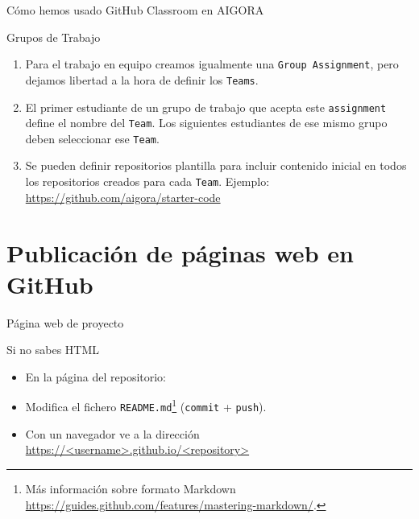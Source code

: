 \documentclass[xcolor={usenames,svgnames,dvipsnames}]{beamer}
\begin{document}
\begin{frame}[label={sec:orga7938a5},fragile]{Cómo hemos usado GitHub Classroom en AIGORA}
 \begin{block}{Grupos de Trabajo}
\begin{enumerate}
\item Para el trabajo en equipo creamos igualmente una \texttt{Group Assignment}, pero dejamos libertad a la hora de definir los \texttt{Teams}.
\item El primer estudiante de un grupo de trabajo que acepta este \texttt{assignment} define el nombre del \texttt{Team}. Los siguientes estudiantes de ese mismo grupo deben seleccionar ese \texttt{Team}.
\item Se pueden definir repositorios plantilla para incluir contenido inicial en todos los repositorios creados para cada \texttt{Team}. Ejemplo: \url{https://github.com/aigora/starter-code}
\end{enumerate}
\end{block}
\end{frame}

\section{Publicación de páginas web en GitHub}
\label{sec:orgcb46848}

\begin{frame}[label={sec:org16b4a2c},fragile]{Página web de \alert{proyecto}}
 \begin{block}{Si no sabes HTML}
\begin{itemize}
\item En la página del repositorio:
\end{itemize}

\begin{center}

\end{center}

\begin{itemize}
\item Modifica el fichero \texttt{README.md}\footnote{Más información sobre formato Markdown \url{https://guides.github.com/features/mastering-markdown/}.} (\texttt{commit} + \texttt{push}).

\item Con un navegador ve a la dirección \url{https://<username>.github.io/<repository>}
\end{itemize}
\end{block}
\end{frame}
\end{document}
